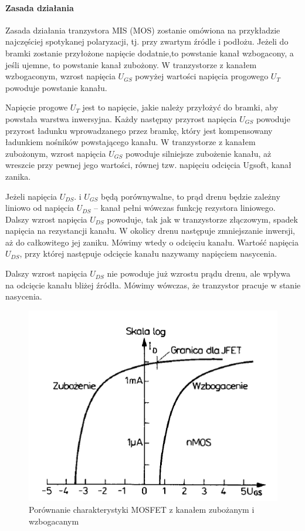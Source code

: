 \documentclass[a4paper,twoside]{report}
\begin{document}
\paragraph{Zasada działania\\}
Zasada działania tranzystora MIS (MOS) zostanie omówiona na przykładzie najczęściej spotykanej polaryzacji, tj. przy zwartym źródle i podłożu. Jeżeli do bramki zostanie przyłożone napięcie dodatnie,to powstanie kanał wzbogacony, a jeśli ujemne, to powstanie kanał zubożony. W tranzystorze z kanałem wzbogaconym, wzrost napięcia $U_{GS}$ powyżej wartości napięcia progowego $U_T$ powoduje powstanie kanału.

Napięcie progowe $U_T$ jest to napięcie, jakie należy przyłożyć do bramki, aby powstała warstwa inwersyjna.
Każdy następny przyrost napięcia $U_{GS}$ powoduje przyrost ładunku wprowadzanego przez bramkę, który jest kompensowany ładunkiem nośników powstającego kanału. W tranzystorze z kanałem zubożonym, wzrost napięcia $U_{GS}$ powoduje silniejsze zubożenie kanału, aż wreszcie przy pewnej jego wartości, równej tzw. napięciu odcięcia Ugsoft, kanał zanika.

Jeżeli napięcia $U_{DS}$. i $U_{GS}$ będą porównywalne, to prąd drenu będzie zależny liniowo od napięcia $U_{DS}$ – kanał pełni wówczas funkcję rezystora liniowego. Dalszy wzrost napięcia $U_{DS}$ powoduje, tak jak w tranzystorze złączowym, spadek napięcia na rezystancji kanału. W okolicy drenu następuje zmniejszanie inwersji, aż do całkowitego jej zaniku. Mówimy wtedy o odcięciu kanału. Wartość napięcia $U_{DS}$, przy której następuje odcięcie kanału nazywamy napięciem nasycenia.

Dalszy wzrost napięcia $U_{DS}$ nie powoduje już wzrostu prądu drenu, ale wpływa na odcięcie kanału bliżej źródła. Mówimy wówczas, że tranzystor pracuje w stanie nasycenia.


\begin{figure}[htbp]
\centering
\includegraphics[scale=0.6]{obrazy/tranzystory/tranunicharpor.png}
\caption{Porównanie charakterystyki MOSFET z kanałem zubożanym i wzbogacanym}
\label{rys:tranUni_charporow}
\end{figure}
\end{document}
